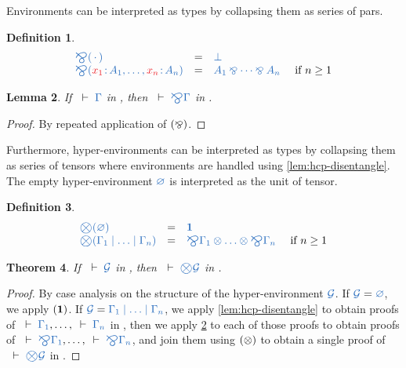 \documentclass[submission,copyright,creativecommons]{eptcs}
\newtheorem{lemma}{Lemma}[section]
\newtheorem{theorem}[lemma]{Theorem}
\newtheorem{definition}[lemma]{Definition}
\begin{document}
Environments can be interpreted as types by collapsing them as series of pars.
\begin{definition}\label{def:bigparr}
  \[
  \begin{array}{lcll}
    \ty{\bigparr(\emptycontext)}
    & = & \ty{\bot}
    \\
    \ty{\bigparr(\tmty{x_1}{A_1} , \dots , \tmty{x_n}{A_n})} 
     & = & \ty{A_1 \parr \dots \parr A_n}
     & \text{ if } n \geq 1
    \\
  \end{array}
  \]
\end{definition}\noindent
\begin{lemma}\label{lem:cp-bigparr}
  If $\seq{\Gamma}$ in \cp, then $\seq{\bigparr\Gamma}$ in \cp.
\end{lemma}\vspace*{-0.75\baselineskip}%
\begin{proof}
  By repeated application of $(\mathbin{\bindnasrepma})$.
\end{proof}\noindent
Furthermore, hyper-environments can be interpreted as types by collapsing them as series of tensors where environments are handled using \cref{lem:hcp-disentangle}. The empty hyper-environment $\ty{\emptyhypercontext}$ is interpreted as the unit of tensor.
\begin{definition}\label{def:bigtens}
  \[
  \begin{array}{lcll}
    \ty{\bigtens(\emptyhypercontext)}
    & = & \ty{\one}
    \\
    \ty{\bigtens(\Gamma_1 \hsep \dots \hsep \Gamma_n)}
    & = & \ty{\bigparr\Gamma_1 \tens \dots \tens \bigparr\Gamma_n}
    & \text{ if } n \geq 1
  \end{array}
  \]
\end{definition}\noindent

\begin{theorem}\label{thm:hcp2cp-bigtens}
  If $\seq{\mathcal{G}}$ in \hcp, then $\seq{\bigtens\mathcal{G}}$ in \cp.
\end{theorem}\vspace*{-0.75\baselineskip}%
\begin{proof}
  By case analysis on the structure of the hyper-environment $\ty{\mathcal{G}}$.
  If $\ty{\mathcal{G}} = \ty{\emptyhypercontext}$, we apply $(\mathbf{1})$.
  If $\ty{\mathcal{G}} = \ty{\Gamma_1 \hsep \dots \hsep \Gamma_n}$, we apply \cref{lem:hcp-disentangle} to obtain proofs of $\seq{\Gamma_1}, \dots, \seq{\Gamma_n}$ in \cp, then we apply \cref{lem:cp-bigparr} to each of those proofs to obtain proofs of $\seq{\bigparr\Gamma_1}, \dots, \seq{\bigparr\Gamma_n}$, and join them using $(\otimes)$ to obtain a single proof of $\seq{\bigtens\mathcal{G}}$ in \cp.
\end{proof}\noindent
\end{document}
